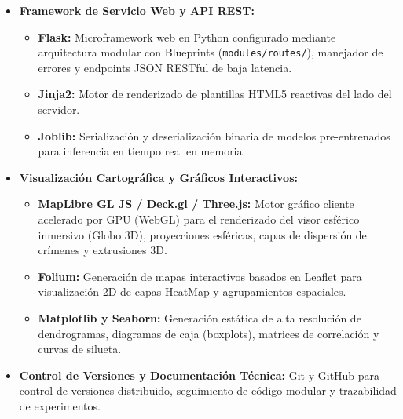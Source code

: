\begin{itemize}
\begin{itemize}
    \end{itemize}
    \item \textbf{Framework de Servicio Web y API REST:}
    \begin{itemize}
        \item \textbf{Flask:} Microframework web en Python configurado mediante arquitectura modular con Blueprints (\texttt{modules/routes/}), manejador de errores y endpoints JSON RESTful de baja latencia.
        \item \textbf{Jinja2:} Motor de renderizado de plantillas HTML5 reactivas del lado del servidor.
        \item \textbf{Joblib:} Serialización y deserialización binaria de modelos pre-entrenados para inferencia en tiempo real en memoria.
    \end{itemize}
    \item \textbf{Visualización Cartográfica y Gráficos Interactivos:}
    \begin{itemize}
        \item \textbf{MapLibre GL JS / Deck.gl / Three.js:} Motor gráfico cliente acelerado por GPU (WebGL) para el renderizado del visor esférico inmersivo (Globo 3D), proyecciones esféricas, capas de dispersión de crímenes y extrusiones 3D.
        \item \textbf{Folium:} Generación de mapas interactivos basados en Leaflet para visualización 2D de capas HeatMap y agrupamientos espaciales.
        \item \textbf{Matplotlib y Seaborn:} Generación estática de alta resolución de dendrogramas, diagramas de caja (boxplots), matrices de correlación y curvas de silueta.
    \end{itemize}
    \item \textbf{Control de Versiones y Documentación Técnica:} Git y GitHub para control de versiones distribuido, seguimiento de código modular y trazabilidad de experimentos.
\end{itemize}

